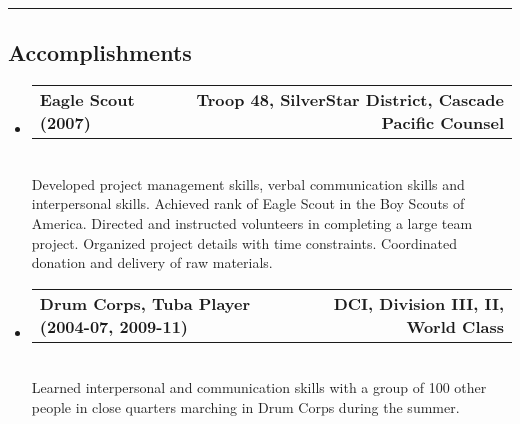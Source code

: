 \documentclass[10pt,letterpaper]{article}
\makeatletter
\newcommand{\headerrow}[2]
{\begin{tabular*}{\linewidth}{l@{\extracolsep{\fill}}r}
	#1 &
	#2 \\
\end{tabular*}}
\makeatother
\begin{document}
\begin{comment}
\hrule
\begin{center}
{\emph{Honors and Projects Continue on Next Page}}

\end{center}

\newpage
\end{comment}

\hrule
\vspace{-0.4em}
\subsection*{Accomplishments}
\begin{itemize}
	\parskip=0.1em

	\item
	\headerrow
	{\textbf{Eagle Scout (2007)}}
	{\textbf{Troop 48, SilverStar District, Cascade Pacific Counsel}}
	\\
	Developed project management skills, verbal communication skills and interpersonal skills. Achieved rank of Eagle Scout in the Boy Scouts of America.  Directed and instructed volunteers in completing a large team project.  Organized project details with time constraints. Coordinated donation and delivery of raw materials.
	
	\item
	\headerrow
	{\textbf{Drum Corps, Tuba Player (2004-07, 2009-11)}}
	{\textbf{DCI, Division III, II, World Class}}
	\\
	Learned interpersonal and communication skills with a group of 100 other people in close quarters marching in Drum Corps during the summer.
\end{itemize}


\begin{comment}
\hrule
\vspace{-0.4em}
\subsection*{References}
\begin{itemize}
  \item
  \headerrow
    {\textbf{Kevin Barry}}
    {kevin.barry@silverbayseafoods.com}
  \\
  \headerrow
    {\textbf{Plant Manager, Silver Bay Seafoods}}
    {907.738.7270}
  \item
  \headerrow
    {\textbf{Doug Hall}}
    {dough@ece.pdx.edu}
  \\
  \headerrow
    {\textbf{Professor, Portland State University}}
    {503.725.5396}
  \item
  \headerrow
    {\textbf{Mark Faust}}
    {faustm@ece.pdx.edu}
  \\
  \headerrow
    {\textbf{Professor, Portland State University}}
    {503.725.5412}
    
\end{itemize}
\end{comment}
\end{document}
